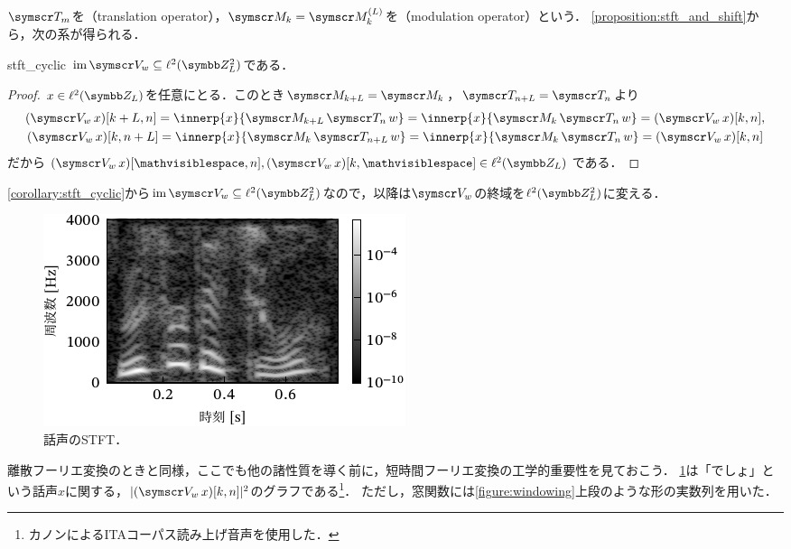 \documentclass[../../main]{subfiles}
\begin{document}
\(\translate{m}\)を（translation operator），\(\modulate{k}=\modulate[L]{k}\)を（modulation operator）という．
\cref{proposition:stft_and_shift}から，次の系が得られる．

\begin{corollary}{}{stft_cyclic}
  \(\img\stft{w}\subseteq\doublecycles{L}\)である．
\end{corollary}

\begin{proof}
  \(x\in\cycles{L}\)を任意にとる．このとき\(\modulate{k+L}=\modulate{k}\)，\(\translate{n+L}=\translate{n}\)より
  \begin{gather*}
    (\stft{w}x)[k+L,n] = \innerp{x}{\modulate{k+L}\translate{n}w}
    = \innerp{x}{\modulate{k}\translate{n}w}
    = (\stft{w}x)[k,n], \\
    (\stft{w}x)[k,n+L] = \innerp{x}{\modulate{k}\translate{n+L}w}
    = \innerp{x}{\modulate{k}\translate{n}w}
    = (\stft{w}x)[k,n]
  \end{gather*}
  だから\((\stft{w}x)[\holder,n],(\stft{w}x)[k,\holder]\in\cycles{L}\)である．
\end{proof}

\cref{corollary:stft_cyclic}から\(\img\stft{w}\subseteq\doublecycles{L}\)なので，\alert{以降は\(\stft{w}\)の終域を\(\doublecycles{L}\)に変える}．

\begin{figure}[htbp]
  \centering
  \includegraphics{figures/phone_spectrogram.pdf}
  \caption{話声のSTFT．}
  \label{figure:phone_spectrogram}
\end{figure}

離散フーリエ変換のときと同様，ここでも他の諸性質を導く前に，短時間フーリエ変換の工学的重要性を見ておこう．
\cref{figure:phone_spectrogram}は「でしょ」という話声\(x\)に関する，\(\abs{(\stft{w}x)[k,n]}^2\)のグラフである\footnote{カノン\cite{canon}によるITAコーパス読み上げ音声を使用した．}．
ただし，窓関数には\cref{figure:windowing}上段のような形の実数列を用いた．
\end{document}
